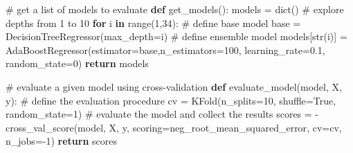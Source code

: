 \documentclass[
  letterpaper,
  DIV=11,
  numbers=noendperiod]{scrreprt}
\newenvironment{Shaded}{\begin{snugshade}}{\end{snugshade}}
\newcommand{\BuiltInTok}[1]{\textcolor[rgb]{0.00,0.23,0.31}{#1}}
\newcommand{\CommentTok}[1]{\textcolor[rgb]{0.37,0.37,0.37}{#1}}
\newcommand{\ControlFlowTok}[1]{\textcolor[rgb]{0.00,0.23,0.31}{\textbf{#1}}}
\newcommand{\DecValTok}[1]{\textcolor[rgb]{0.68,0.00,0.00}{#1}}
\newcommand{\FloatTok}[1]{\textcolor[rgb]{0.68,0.00,0.00}{#1}}
\newcommand{\KeywordTok}[1]{\textcolor[rgb]{0.00,0.23,0.31}{\textbf{#1}}}
\newcommand{\NormalTok}[1]{\textcolor[rgb]{0.00,0.23,0.31}{#1}}
\newcommand{\OperatorTok}[1]{\textcolor[rgb]{0.37,0.37,0.37}{#1}}
\newcommand{\StringTok}[1]{\textcolor[rgb]{0.13,0.47,0.30}{#1}}
\newcommand{\VariableTok}[1]{\textcolor[rgb]{0.07,0.07,0.07}{#1}}
\begin{document}
\begin{Shaded}
\begin{Highlighting}[]
\CommentTok{\# get a list of models to evaluate}
\KeywordTok{def}\NormalTok{ get\_models():}
\NormalTok{    models }\OperatorTok{=} \BuiltInTok{dict}\NormalTok{()}
    \CommentTok{\# explore depths from 1 to 10}
    \ControlFlowTok{for}\NormalTok{ i }\KeywordTok{in} \BuiltInTok{range}\NormalTok{(}\DecValTok{1}\NormalTok{,}\DecValTok{34}\NormalTok{):}
        \CommentTok{\# define base model}
\NormalTok{        base }\OperatorTok{=}\NormalTok{ DecisionTreeRegressor(max\_depth}\OperatorTok{=}\NormalTok{i)}
        \CommentTok{\# define ensemble model}
\NormalTok{        models[}\BuiltInTok{str}\NormalTok{(i)] }\OperatorTok{=}\NormalTok{ AdaBoostRegressor(estimator}\OperatorTok{=}\NormalTok{base,n\_estimators}\OperatorTok{=}\DecValTok{100}\NormalTok{, learning\_rate}\OperatorTok{=}\FloatTok{0.1}\NormalTok{, random\_state}\OperatorTok{=}\DecValTok{0}\NormalTok{)}
    \ControlFlowTok{return}\NormalTok{ models}

\CommentTok{\# evaluate a given model using cross{-}validation}
\KeywordTok{def}\NormalTok{ evaluate\_model(model, X, y):}
    \CommentTok{\# define the evaluation procedure}
\NormalTok{    cv }\OperatorTok{=}\NormalTok{ KFold(n\_splits}\OperatorTok{=}\DecValTok{10}\NormalTok{, shuffle}\OperatorTok{=}\VariableTok{True}\NormalTok{, random\_state}\OperatorTok{=}\DecValTok{1}\NormalTok{)}
    \CommentTok{\# evaluate the model and collect the results}
\NormalTok{    scores }\OperatorTok{=} \OperatorTok{{-}}\NormalTok{cross\_val\_score(model, X, y, scoring}\OperatorTok{=}\StringTok{\textquotesingle{}neg\_root\_mean\_squared\_error\textquotesingle{}}\NormalTok{, cv}\OperatorTok{=}\NormalTok{cv, n\_jobs}\OperatorTok{={-}}\DecValTok{1}\NormalTok{)}
    \ControlFlowTok{return}\NormalTok{ scores}


\end{Highlighting}
\end{Shaded}
\end{document}
